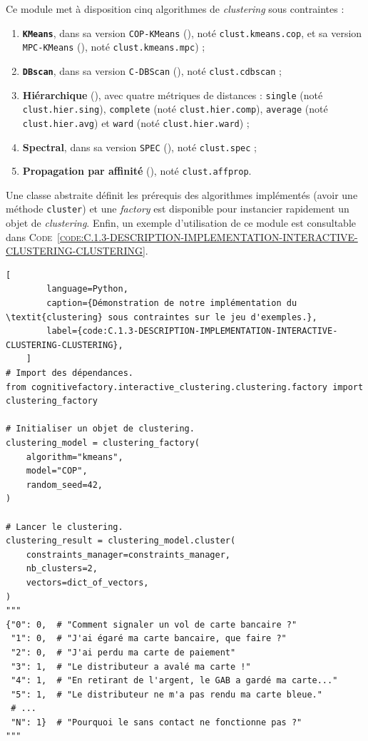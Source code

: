 	Ce module met à disposition cinq algorithmes de \textit{clustering} sous contraintes :
	\begin{enumerate}
		\item \textbf{\texttt{KMeans}}, dans sa version \texttt{COP-KMeans} (\cite{wagstaff-etal:2001:constrained-kmeans-clustering}), noté \texttt{clust.kmeans.cop}, et sa version \texttt{MPC-KMeans} (\cite{khan-etal:2012:multiple-parameter-based}), noté \texttt{clust.kmeans.mpc}) ;
		\item \textbf{\texttt{DBscan}}, dans sa version \texttt{C-DBScan} (\cite{ruiz-etal:2010:densitybased-semisupervised-clustering}), noté \texttt{clust.cdbscan} ;
		\item \textbf{Hiérarchique} (\cite{davidson-ravi:2005:agglomerative-hierarchical-clustering}), avec quatre métriques de distances : \texttt{single} (noté \texttt{clust.hier.sing}), \texttt{complete} (noté \texttt{clust.hier.comp}), \texttt{average} (noté \texttt{clust.hier.avg}) et \texttt{ward} (noté \texttt{clust.hier.ward}) ;
		\item \textbf{Spectral}, dans sa version \texttt{SPEC} (\cite{kamvar-etal:2003:spectral-learning}), noté \texttt{clust.spec} ;
		\item \textbf{Propagation par affinité} (\cite{givoni-frey:2009:semisupervised-affinity-propagation}), noté \texttt{clust.affprop}.
	\end{enumerate}
	
	Une classe abstraite définit les prérequis des algorithmes implémentés (avoir une méthode \texttt{cluster}) et une \textit{factory} est disponible pour instancier rapidement un objet de \textit{clustering}.
	Enfin, un exemple d'utilisation de ce module est consultable dans \textsc{Code~\ref{code:C.1.3-DESCRIPTION-IMPLEMENTATION-INTERACTIVE-CLUSTERING-CLUSTERING}}.
	
	
	\begin{lstlisting}[
		language=Python,
		caption={Démonstration de notre implémentation du \textit{clustering} sous contraintes sur le jeu d'exemples.},
		label={code:C.1.3-DESCRIPTION-IMPLEMENTATION-INTERACTIVE-CLUSTERING-CLUSTERING},
	]
# Import des dépendances.
from cognitivefactory.interactive_clustering.clustering.factory import clustering_factory

# Initialiser un objet de clustering.
clustering_model = clustering_factory(
	algorithm="kmeans",
	model="COP",
	random_seed=42,
)

# Lancer le clustering.
clustering_result = clustering_model.cluster(
	constraints_manager=constraints_manager,
	nb_clusters=2,
	vectors=dict_of_vectors,
)
"""
{"0": 0,  # "Comment signaler un vol de carte bancaire ?"
 "1": 0,  # "J'ai égaré ma carte bancaire, que faire ?"
 "2": 0,  # "J'ai perdu ma carte de paiement"
 "3": 1,  # "Le distributeur a avalé ma carte !"
 "4": 1,  # "En retirant de l'argent, le GAB a gardé ma carte..."
 "5": 1,  # "Le distributeur ne m'a pas rendu ma carte bleue."
 # ...
 "N": 1}  # "Pourquoi le sans contact ne fonctionne pas ?"
"""
	\end{lstlisting}
	
